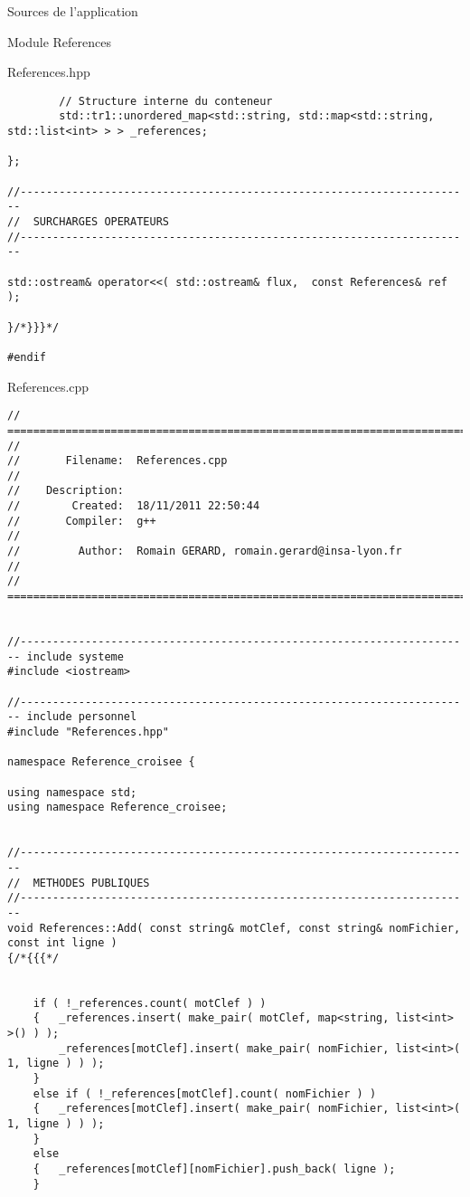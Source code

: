 \documentclass{article}
\begin{document}
\begin{section}{Sources de l'application}
\begin{subsection}{Module References}
\begin{paragraph}{References.hpp}
\begin{verbatim}
        // Structure interne du conteneur
        std::tr1::unordered_map<std::string, std::map<std::string, std::list<int> > > _references;

};

//----------------------------------------------------------------------
//  SURCHARGES OPERATEURS
//----------------------------------------------------------------------

std::ostream& operator<<( std::ostream& flux,  const References& ref );

}/*}}}*/

#endif

  \end{verbatim}
  \end{paragraph}



\newpage
  \begin{paragraph}{References.cpp}
   \begin{verbatim}
// =====================================================================================
//
//       Filename:  References.cpp
//
//    Description:
//        Created:  18/11/2011 22:50:44
//       Compiler:  g++
//
//         Author:  Romain GERARD, romain.gerard@insa-lyon.fr
//
// =====================================================================================


//---------------------------------------------------------------------- include systeme
#include <iostream>

//---------------------------------------------------------------------- include personnel
#include "References.hpp"

namespace Reference_croisee {

using namespace std;
using namespace Reference_croisee;


//----------------------------------------------------------------------
//  METHODES PUBLIQUES
//----------------------------------------------------------------------
void References::Add( const string& motClef, const string& nomFichier, const int ligne )
{/*{{{*/


    if ( !_references.count( motClef ) )
    {	_references.insert( make_pair( motClef, map<string, list<int> >() ) );
        _references[motClef].insert( make_pair( nomFichier, list<int>( 1, ligne ) ) );
    }
    else if ( !_references[motClef].count( nomFichier ) )
    {	_references[motClef].insert( make_pair( nomFichier, list<int>( 1, ligne ) ) );
    }
    else
    {	_references[motClef][nomFichier].push_back( ligne );
    }



\end{verbatim}
\end{paragraph}
\end{subsection}
\end{section}
\end{document}
